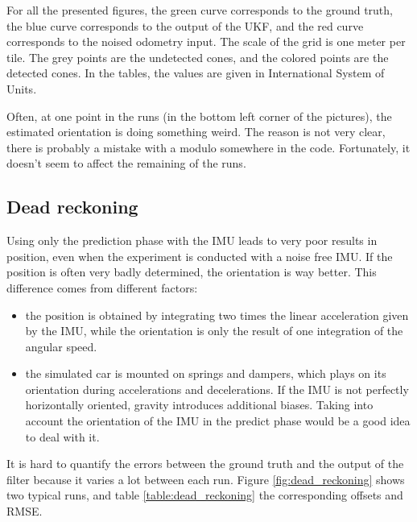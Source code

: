 \documentclass[10pt,a4paper, twocolumn]{article}
\begin{document}
For all the presented figures, the green curve corresponds to the ground truth, the blue curve corresponds to the output of the UKF, and the red curve corresponds to the noised odometry input. The scale of the grid is one meter per tile. The grey points are the undetected cones, and the colored points are the detected cones. In the tables, the values are given in International System of Units.

Often, at one point in the runs (in the bottom left corner of the pictures), the estimated orientation is doing something weird. The reason is not very clear, there is probably a mistake with a modulo somewhere in the code. Fortunately, it doesn't seem to affect the remaining of the runs.

\subsection{Dead reckoning}
Using only the prediction phase with the IMU leads to very poor results in position, even when the experiment is conducted with a noise free IMU. If the position is often very badly determined, the orientation is way better. This difference comes from different factors:
\begin{itemize}
	\item the position is obtained by integrating two times the linear acceleration given by the IMU, while the orientation is only the result of one integration of the angular speed.
	\item the simulated car is mounted on springs and dampers, which plays on its orientation during accelerations and decelerations. If the IMU is not perfectly horizontally oriented, gravity introduces additional biases. Taking into account the orientation of the IMU in the predict phase would be a good idea to deal with it.
\end{itemize}
It is hard to quantify the errors between the ground truth and the output of the filter because it varies a lot between each run. Figure \ref{fig:dead_reckoning} shows two typical runs, and table \ref{table:dead_reckoning} the corresponding offsets and RMSE.
\end{document}
